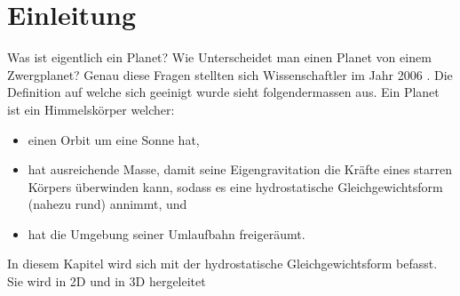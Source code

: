 %
%
%
%
\section{Einleitung\label{planet:section:einleitung}}
Was ist eigentlich ein Planet?
Wie Unterscheidet man einen Planet von einem Zwergplanet?
Genau diese Fragen stellten sich Wissenschaftler im Jahr 2006 \cite{planet:iaub5}.
Die Definition auf welche sich geeinigt wurde sieht folgendermassen aus.
Ein Planet ist ein Himmelskörper welcher:
\begin{itemize}
	\item einen Orbit um eine Sonne hat,
	\item hat ausreichende Masse, damit seine Eigengravitation die Kräfte eines starren Körpers überwinden kann, sodass es eine hydrostatische Gleichgewichtsform (nahezu rund) annimmt, und
	\item hat die Umgebung seiner Umlaufbahn freigeräumt.
\end{itemize}

In diesem Kapitel wird sich mit der hydrostatische Gleichgewichtsform befasst.
Sie wird in 2D und in 3D hergeleitet


